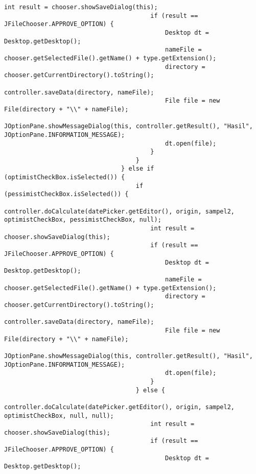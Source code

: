 \begin{lstlisting}[caption= main.java]
                                        int result = chooser.showSaveDialog(this);
                                        if (result == JFileChooser.APPROVE_OPTION) {
                                            Desktop dt = Desktop.getDesktop();
                                            nameFile = chooser.getSelectedFile().getName() + type.getExtension();
                                            directory = chooser.getCurrentDirectory().toString();
                                            controller.saveData(directory, nameFile);
                                            File file = new File(directory + "\\" + nameFile);
                                            JOptionPane.showMessageDialog(this, controller.getResult(), "Hasil", JOptionPane.INFORMATION_MESSAGE);
                                            dt.open(file);
                                        }
                                    }
                                } else if (optimistCheckBox.isSelected()) {
                                    if (pessimistCheckBox.isSelected()) {
                                        controller.doCalculate(datePicker.getEditor(), origin, sampel2, optimistCheckBox, pessimistCheckBox, null);
                                        int result = chooser.showSaveDialog(this);
                                        if (result == JFileChooser.APPROVE_OPTION) {
                                            Desktop dt = Desktop.getDesktop();
                                            nameFile = chooser.getSelectedFile().getName() + type.getExtension();
                                            directory = chooser.getCurrentDirectory().toString();
                                            controller.saveData(directory, nameFile);
                                            File file = new File(directory + "\\" + nameFile);
                                            JOptionPane.showMessageDialog(this, controller.getResult(), "Hasil", JOptionPane.INFORMATION_MESSAGE);
                                            dt.open(file);
                                        }
                                    } else {
                                        controller.doCalculate(datePicker.getEditor(), origin, sampel2, optimistCheckBox, null, null);
                                        int result = chooser.showSaveDialog(this);
                                        if (result == JFileChooser.APPROVE_OPTION) {
                                            Desktop dt = Desktop.getDesktop();

\end{lstlisting}
